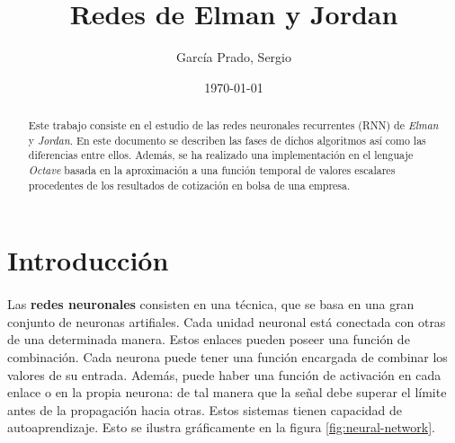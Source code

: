 \documentclass[10pt, a4paper,spanish]{article}
\title{\vspace{-15mm}\fontsize{24pt}{10pt}\selectfont\textbf{Redes de Elman y Jordan}} %
\author{García Prado, Sergio}
\date{\today}
\begin{document}
	\maketitle %

	\thispagestyle{fancy} %



	\begin{abstract}
		\noindent Este trabajo consiste en el estudio de las redes neuronales recurrentes (RNN) de \emph{Elman} y \emph{Jordan}. En este documento se describen las fases de dichos algoritmos así como las diferencias entre ellos. Además, se ha realizado una implementación en el lenguaje \emph{Octave} basada en la aproximación a una función temporal de valores escalares procedentes de los resultados de cotización en bolsa de una empresa.
	\end{abstract}



  \section{Introducción}

    \paragraph{}
		Las \textbf{redes neuronales} consisten en una técnica, que se basa en una gran conjunto de neuronas artifiales. Cada unidad neuronal está conectada con otras de una determinada manera. Estos enlaces pueden poseer una función de combinación. Cada neurona puede tener una función encargada de combinar los valores de su entrada. Además, puede haber una función de activación en cada enlace o en la propia neurona: de tal manera que la señal debe superar el límite antes de la propagación hacia otras. Estos sistemas tienen capacidad de  autoaprendizaje. Esto se ilustra gráficamente en la figura \ref{fig:neural-network}.
\end{document}
